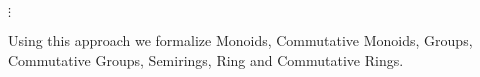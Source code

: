 \begin{code}
  \AgdaSpace{}%
  \AgdaSymbol{=}\AgdaSpace{}%
  \AgdaSpace{}%
  \AgdaSymbol{\{}\AgdaSymbol{\}}\AgdaSpace{}%
  \AgdaSpace{}%
  \<%
  \\
  \\[\AgdaEmptyExtraSkip]%
  \>[2]\AgdaSpace{}%
  \AgdaSymbol{:}\AgdaSpace{}%
  \<%
  \\
  \>[2]\AgdaSpace{}%
  \AgdaSymbol{=}\AgdaSpace{}%
  \AgdaSpace{}%
  \AgdaSymbol{\{}\AgdaSpace{}%
  \AgdaSpace{}%
  \AgdaSymbol{=}\AgdaSpace{}%
  \AgdaSpace{}%
  \AgdaSymbol{;}\AgdaSpace{}%
  \AgdaSpace{}%
  \AgdaSymbol{=}\AgdaSpace{}%
  \AgdaSpace{}%
  \AgdaSymbol{\}}\<%
  \\%
  \\[\AgdaEmptyExtraSkip]%
  \>[2]\AgdaSpace{}%
  \AgdaSpace{}%
  \<%
  \\
  \>[2][@{}l@{\AgdaIndent{0}}]%
  \>[4]\AgdaSpace{}%
  \AgdaSpace{}%
  \\
  \>[4]$\vdots$
  \\
  \>[4]\AgdaSpace{}%
  \AgdaSymbol{=}\AgdaSpace{}%
  \AgdaSpace{}%
  \AgdaSpace{}%
  \AgdaSpace{}%
  \AgdaSpace{}%
  \<%
  \<%
\end{code}


\noindent
Using this approach we formalize Monoids, Commutative Monoids, Groups,
Commutative Groups, Semirings, Ring and Commutative Rings.
